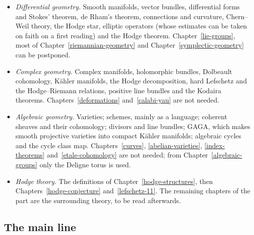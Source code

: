 \begin{itemize}
complex variables, and the Dolbeault--Grothendieck lemma; Banach and Hilbert spaces and compact operators; Sobolev spaces. The geometric measure theory at the end of
Chapter~\ref{measure-theory} and the second half of Chapter~\ref{functional-analysis} are not on the route.
\item \emph{Differential geometry.} Smooth manifolds, vector bundles, differential forms and Stokes' theorem, de Rham's theorem, connections and curvature, Chern--Weil theory,
the Hodge star, elliptic operators (whose estimates can be taken on faith on a first reading) and the Hodge theorem. Chapter~\ref{lie-groups}, most of
Chapter~\ref{riemannian-geometry} and Chapter~\ref{symplectic-geometry} can be postponed.
\item \emph{Complex geometry.} Complex manifolds, holomorphic bundles, Dolbeault cohomology, K\"ahler manifolds, the Hodge decomposition, hard Lefschetz and the Hodge--Riemann
relations, positive line bundles and the Kodaira theorems. Chapters~\ref{deformations} and~\ref{calabi-yau} are not needed.
\item \emph{Algebraic geometry.} Varieties; schemes, mainly as a language; coherent sheaves and their cohomology; divisors and line bundles; GAGA, which makes smooth projective
varieties into compact K\"ahler manifolds; algebraic cycles and the cycle class map. Chapters~\ref{curves}, \ref{abelian-varieties}, \ref{index-theorems}
and~\ref{etale-cohomology} are not needed; from Chapter~\ref{algebraic-groups} only the Deligne torus is used.
\item \emph{Hodge theory.} The definitions of Chapter~\ref{hodge-structures}, then Chapters~\ref{hodge-conjecture} and~\ref{lefschetz-11}. The remaining chapters of the part are the
surrounding theory, to be read afterwards.
\end{itemize}

\subsection{The main line}\label{introduction:subsection-main-line}

